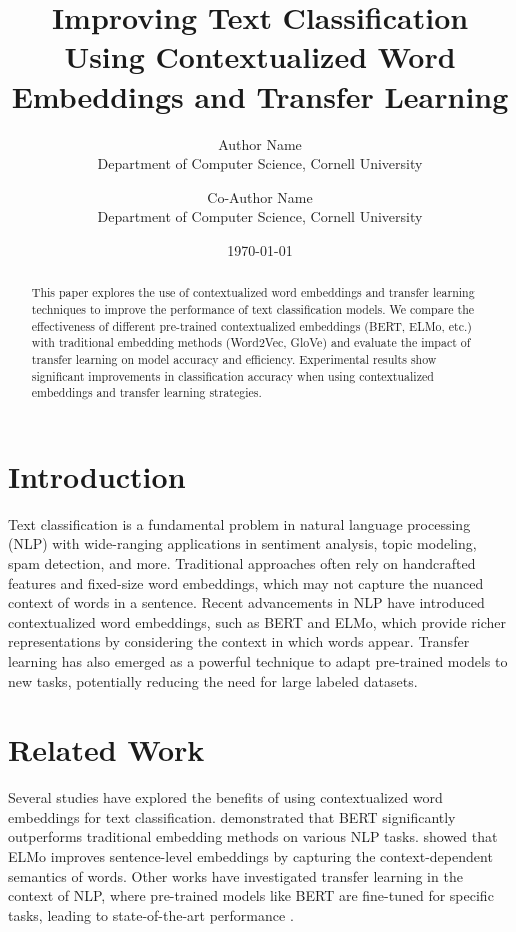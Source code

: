 \documentclass{article}
\title{Improving Text Classification Using Contextualized Word Embeddings and Transfer Learning}
\author{Author Name \\
  Department of Computer Science, Cornell University \\
  \and Co-Author Name \\
  Department of Computer Science, Cornell University}
\date{\today}
\begin{document}
\maketitle

\begin{abstract}
This paper explores the use of contextualized word embeddings and transfer learning techniques to improve the performance of text classification models. We compare the effectiveness of different pre-trained contextualized embeddings (BERT, ELMo, etc.) with traditional embedding methods (Word2Vec, GloVe) and evaluate the impact of transfer learning on model accuracy and efficiency. Experimental results show significant improvements in classification accuracy when using contextualized embeddings and transfer learning strategies.
\end{abstract}

\section{Introduction}
Text classification is a fundamental problem in natural language processing (NLP) with wide-ranging applications in sentiment analysis, topic modeling, spam detection, and more. Traditional approaches often rely on handcrafted features and fixed-size word embeddings, which may not capture the nuanced context of words in a sentence. Recent advancements in NLP have introduced contextualized word embeddings, such as BERT and ELMo, which provide richer representations by considering the context in which words appear. Transfer learning has also emerged as a powerful technique to adapt pre-trained models to new tasks, potentially reducing the need for large labeled datasets.

\section{Related Work}
Several studies have explored the benefits of using contextualized word embeddings for text classification. \cite{DBLP:journals/corr/abs-1801-07416} demonstrated that BERT significantly outperforms traditional embedding methods on various NLP tasks. \cite{DBLP:journals/corr/abs-1803-09823} showed that ELMo improves sentence-level embeddings by capturing the context-dependent semantics of words. Other works have investigated transfer learning in the context of NLP, where pre-trained models like BERT are fine-tuned for specific tasks, leading to state-of-the-art performance \cite{DBLP:conf/emnlp/LiuXLL19}.
\end{document}
